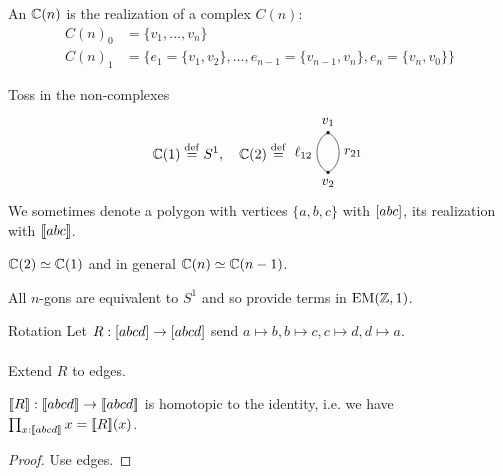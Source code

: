 \documentclass[14pt,aspectratio=169,compress]{beamer}
\begin{document}
\begin{frame}
\begin{definition}
An  \( \mathbb{C}(n) \) is the realization of a complex \( C(n) \):
\vspace{-10pt}\begin{align*}
C(n)_0 &= \{v_1,\ldots,v_n\} \\
C(n)_1 &= \{e_1=\{v_1,v_2\}, \ldots, e_{n-1}=\{v_{n-1}, v_n\}, e_n=\{v_n, v_0\}\}
\end{align*}
\end{definition}
\vspace{-10pt}Toss in the non-complexes \vspace{-20pt}
\[ \ccc(1)\defeq S^1,\quad \ccc(2)\defeq \begin{tikzpicture}[scale=0.5, baseline=3.5mm]
\tikzset{arrow/.style={-{Stealth[scale=1.1]}}}
\tikzset{oo/.style={circle, scale=0.25, fill=black}}
\tikzset{ooo/.style={circle, scale=0.25, fill=none}}
\node[oo, label=above:\( v_1 \)] (V1) at (0, 2) {};
\node[oo, label=below:\( v_2 \)] (V2) at (0, 0) {};
\node[ooo] (V21) at (0.3, 1.75) {};
\node[ooo] (V22) at (0.3, 0.25) {};
\draw (V1) edge[bend right=60, swap, "\( \ell_{12} \)"] (V2);
\draw (V1) edge[bend left=60, "\( r_{21} \)"] (V2);
\end{tikzpicture}\]
We sometimes denote a polygon with vertices \( \{a, b, c\} \) with \( [{abc}] \), its realization with \( [\![{abc}]\!] \).
\end{frame}

\begin{frame}
\begin{lemma}
\( \mathbb{C}(2)\simeq \mathbb{C}(1) \) and in general \( \mathbb{C}(n)\simeq\mathbb{C}(n-1) \).
\end{lemma}
\begin{corollary}
All \( n \)-gons are equivalent to \( S^1 \) and so provide terms in \( \mathrm{EM}(\mathbb{Z},1) \).
\end{corollary}
\end{frame}

\begin{frame}{Rotation}
Let \( R:[{abcd}]\to[{abcd}] \) send \( a\mapsto b , b\mapsto c , c\mapsto d, d\mapsto a \). \\~\\

Extend \( R \) to edges.

\begin{lemma}
\( [\![{R}]\!]:[\![{abcd}]\!]\to[\![{abcd}]\!] \) is homotopic to the identity, i.e. we have \( \prod_{x:[\![{abcd}]\!]}x=[\![{R}]\!](x) \).
\end{lemma}
\begin{proof}
Use edges.
\end{proof}
\end{frame}
\end{document}
